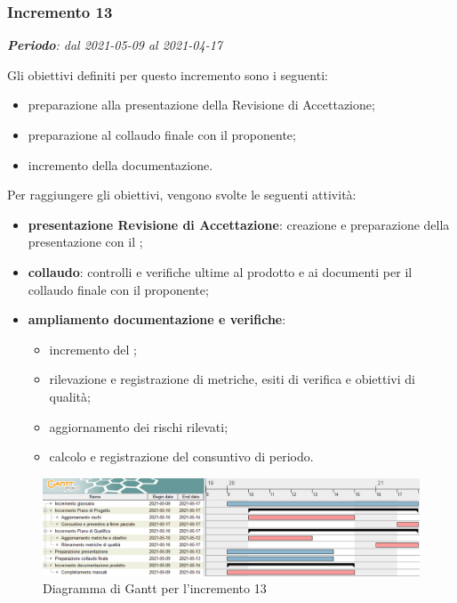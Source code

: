 \subsubsection{Incremento 13}
\textit{\textbf{Periodo}: dal 2021-05-09 al 2021-04-17}

Gli obiettivi definiti per questo incremento sono i seguenti:
\begin{itemize}

\item preparazione alla presentazione della Revisione di Accettazione;
\item preparazione al collaudo finale con il proponente;
\item incremento della documentazione.
\end{itemize}

Per raggiungere gli obiettivi, vengono svolte le seguenti attività:
\begin{itemize}
\item \textbf{presentazione Revisione di Accettazione}: creazione e preparazione della presentazione con il \VT{};
\item \textbf{collaudo}: controlli e verifiche ultime al prodotto e ai documenti per il collaudo finale con il proponente;
\item \textbf{ampliamento documentazione e verifiche}:
\begin{itemize}
\item incremento del ;
\item rilevazione e registrazione di metriche, esiti di verifica e obiettivi di qualità;
\item aggiornamento dei rischi rilevati;
\item calcolo e registrazione del consuntivo di periodo.
\end{itemize}

\end{itemize}
\begin{figure}[H]
\centering

\centerline{\includegraphics[scale=0.6]{res/Pianificazione/Fasi/VerificaIncrementi/ganttIncremento13}}
\caption{Diagramma di Gantt per l'incremento 13}
\end{figure}